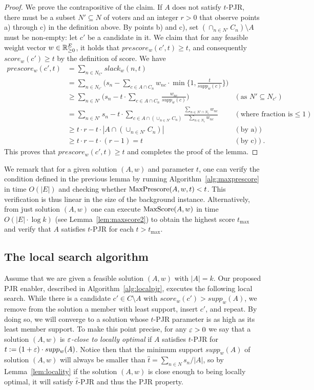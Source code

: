 \begin{proof} 
We prove the contrapositive of the claim. If $A$ does not satisfy $t$-PJR, there must be a subset $N'\subseteq N$ of voters and an integer $r>0$ that observe points a) through c) in the definition above. By points b) and c), set $(\cap_{n\in N'} C_n)\setminus A$ must be non-empty: let $c'$ be a candidate in it. We claim that for any feasible weight vector $w\in \mathbb{R}_{\geq 0}^E$, it holds that $prescore_w(c',t)\geq t$, and consequently $score_w(c')\geq t$ by the definition of score. We have
%
\begin{align*} prescore_w(c',t) &= \sum_{n\in N_{C'}}  slack_w(n,t) \\
&= \sum_{n\in N_{c'}} \Big(s_n - \sum_{c\in A\cap C_n} w_{nc}\cdot \min\Big\{1, \frac{t}{supp_w(c)}\Big\}\Big) \\
&\geq \sum_{n\in N'} \Big(s_n - t\cdot \sum_{c\in A\cap C_n} \frac{w_{nc}}{supp_w(c)}\Big) & (\text{as } N'\subseteq N_{c'})\\
&= \sum_{n\in N'} s_n - t\cdot \sum_{c\in A\cap(\cup_{n\in N'} C_n)} \frac{\sum_{n\in N'\cap N_c} w_{nc}}{\sum_{n\in N_c} w_{nc}} 
& (\text{where fraction is } \leq 1)\\ 
&\geq t\cdot r - t\cdot |A\cap (\cup_{n\in N'} C_n)| & (\text{by a)})\\
& \geq t\cdot r - t\cdot (r-1) = t & (\text{by c)}). \end{align*}
%
This proves that $prescore_w(c',t) \geq t$ and completes the proof of the lemma.
\end{proof}

We remark that for a given solution $(A,w)$ and parameter $t$, one can verify the condition defined in the previous lemma by running Algorithm~\ref{alg:maxprescore} in time $O(|E|)$ and checking whether $\operatorname{MaxPrescore}(A,w,t)<t$. This verification is thus linear in the size of the background instance. Alternatively, from just solution $(A,w)$ one can execute $\operatorname{MaxScore}(A,w)$ in time $O(|E|\cdot \log k)$ (see Lemma~\ref{lem:maxscore2}) to obtain the highest score $t_{\max}$ and verify that $A$ satisfies $t$-PJR for each $t>t_{\max}$.

\subsection{The local search algorithm}

Assume that we are given a feasible solution $(A,w)$ with $|A|=k$. Our proposed PJR enabler, described in Algorithm~\ref{alg:localpjr}, executes the following local search. 
While there is a candidate $c'\in C\setminus A$ with $score_w(c')>supp_w(A)$, we remove from the solution a member with least support, insert $c'$, and repeat. 
By doing so, we will converge to a solution whose $t$-PJR parameter is as high as its least member support. 
To make this point precise, for any $\varepsilon>0$ we say that a solution $(A,w)$ is \emph{$\varepsilon$-close to locally optimal} if $A$ satisfies $t$-PJR for $t:=(1+\varepsilon)\cdot supp_{w}(A)$. 
Notice then that the minimum support $supp_{w}(A)$ of solution $(A,w)$ will always be smaller than $\hat{t}=\sum_{n\in N} s_n / |A|$, 
so by Lemma~\ref{lem:locality} if the solution $(A,w)$ is close enough to being locally optimal, it will satisfy $\hat{t}$-PJR and thus the PJR property.

